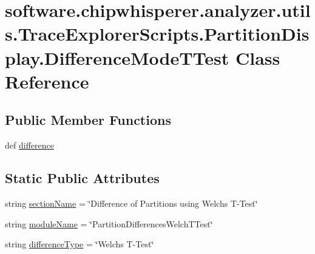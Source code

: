 \hypertarget{classsoftware_1_1chipwhisperer_1_1analyzer_1_1utils_1_1TraceExplorerScripts_1_1PartitionDisplay_1_1DifferenceModeTTest}{}\section{software.\+chipwhisperer.\+analyzer.\+utils.\+Trace\+Explorer\+Scripts.\+Partition\+Display.\+Difference\+Mode\+T\+Test Class Reference}
\label{classsoftware_1_1chipwhisperer_1_1analyzer_1_1utils_1_1TraceExplorerScripts_1_1PartitionDisplay_1_1DifferenceModeTTest}
\subsection*{Public Member Functions}
\begin{DoxyCompactItemize}
\item 
def \hyperlink{classsoftware_1_1chipwhisperer_1_1analyzer_1_1utils_1_1TraceExplorerScripts_1_1PartitionDisplay_1_1DifferenceModeTTest_a09a947f1d792c473260189d5531feff7}{difference}
\end{DoxyCompactItemize}
\subsection*{Static Public Attributes}
\begin{DoxyCompactItemize}
\item 
string \hyperlink{classsoftware_1_1chipwhisperer_1_1analyzer_1_1utils_1_1TraceExplorerScripts_1_1PartitionDisplay_1_1DifferenceModeTTest_a0fb8b4f27568aebdfc67d85d1176c406}{section\+Name} = \char`\"{}Difference of Partitions using Welch\textquotesingle{}s T-\/Test\char`\"{}
\item 
string \hyperlink{classsoftware_1_1chipwhisperer_1_1analyzer_1_1utils_1_1TraceExplorerScripts_1_1PartitionDisplay_1_1DifferenceModeTTest_a22c55a5fc394bf227f49064147a10e3b}{module\+Name} = \char`\"{}Partition\+Differences\+Welch\+T\+Test\char`\"{}
\item 
string \hyperlink{classsoftware_1_1chipwhisperer_1_1analyzer_1_1utils_1_1TraceExplorerScripts_1_1PartitionDisplay_1_1DifferenceModeTTest_a41c008678b4f7e152489dd2cffc9e4c0}{difference\+Type} = \char`\"{}Welch\textquotesingle{}s T-\/Test\char`\"{}
\end{DoxyCompactItemize}



